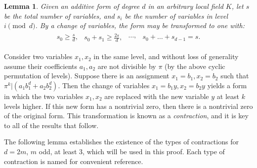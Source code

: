 \documentclass[12pt]{amsart}
\newtheorem{lemma}{Lemma}
\begin{document}
\begin{lemma}
Given an additive form of degree $d$ in an arbitrary local field $K$, let $s$ be the total number of variables, and $s_i$ be the number of variables in level $i \pmod{d}$. By a change of variables, the form may be transformed to one with:
\begin{align}
\begin{split}
s_0 \ge \frac{s}{d},  
\end{split}
\begin{split}
s_0 + s_1 \ge \frac{2s}{d},
\end{split}
\begin{split}
\ldots,
\end{split}
\begin{split}
s_0 + \ldots + s_{d-1} = s.
\end{split}
\end{align}
\end{lemma}

Consider two variables $x_1,x_2$ in the same level, and without loss of generality assume their coefficients $a_1,a_2$ are not divisible by $\pi$ (by the above cyclic permutation of levels).  Suppose there is an assignment $x_1 = b_1, x_2 = b_2$ such that $\pi^k | (a_1 b_1^d + a_2 b_2^d)$.  Then the change of variables $x_1=b_1 y, x_2 = b_2 y$ yields a form in which the two variables $x_1, x_2$ are replaced with the new variable $y$ at least $k$ levels higher.  If this new form has a nontrivial zero, then there is a nontrivial zero of the original form.  This transformation is known as a \textit{contraction}, and it is key to all of the results that follow.

The following lemma establishes the existence of the types of contractions for $d=2m$, $m$ odd, at least 3, which will be used in this proof.  Each type of contraction is named for convenient reference.
\end{document}

